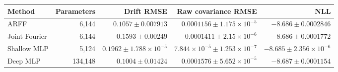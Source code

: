 \begin{tabular}{lrrrr}\toprule Method & Parameters & Drift RMSE & Raw covariance RMSE & NLL\\\midrule
ARFF & 6,144 & $0.1057\pm 0.007913$ & $0.0001156\pm 1.175\times10^{-5}$ & $-8.686\pm 0.0002846$\\
Joint Fourier & 6,144 & $0.1593\pm 0.00249$ & $0.0001411\pm 2.15\times10^{-6}$ & $-8.686\pm 0.0001772$\\
Shallow MLP & 5,124 & $0.1962\pm 1.788\times10^{-5}$ & $7.844\times10^{-5}\pm 1.253\times10^{-7}$ & $-8.685\pm 2.356\times10^{-6}$\\
Deep MLP & 134,148 & $0.1004\pm 0.01424$ & $0.0001576\pm 5.652\times10^{-5}$ & $-8.687\pm 0.0001154$\\
\bottomrule\end{tabular}
